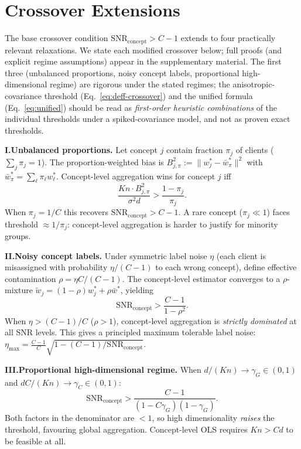 \documentclass[11pt]{article}
\newcommand{\SNR}{\mathrm{SNR}_{\mathrm{concept}}}
\begin{document}
\section{Crossover Extensions}
\label{app:extensions}

The base crossover condition $\SNR > C{-}1$ extends to four practically relevant relaxations.
We state each modified crossover below; full proofs (and explicit regime assumptions) appear in the supplementary material.
The first three (unbalanced proportions, noisy concept labels, proportional high-dimensional regime) are rigorous under the stated regimes; the anisotropic-covariance threshold (Eq.~\ref{eq:deff-crossover}) and the unified formula (Eq.~\ref{eq:unified}) should be read as \emph{first-order heuristic combinations} of the individual thresholds under a spiked-covariance model, and not as proven exact thresholds.

\textbf{I.\;Unbalanced proportions.}
Let concept $j$ contain fraction $\pi_j$ of clients ($\sum_j \pi_j = 1$).
The proportion-weighted bias is $B_{j,\pi}^2 := \|w_j^* - \bar w^*_\pi\|^2$ with $\bar w^*_\pi = \sum_\ell \pi_\ell w_\ell^*$.
Concept-level aggregation wins for concept $j$ iff
\begin{equation}\label{eq:unbal-crossover}
\frac{Kn \cdot B_{j,\pi}^2}{\sigma^2 d} > \frac{1 - \pi_j}{\pi_j}.
\end{equation}
When $\pi_j = 1/C$ this recovers $\SNR > C{-}1$.
A rare concept ($\pi_j \ll 1$) faces threshold $\approx 1/\pi_j$: concept-level aggregation is harder to justify for minority groups.

\textbf{II.\;Noisy concept labels.}
Under symmetric label noise $\eta$ (each client is misassigned with probability $\eta/(C{-}1)$ to each wrong concept), define effective contamination $\rho = \eta C/(C{-}1)$.
The concept-level estimator converges to a $\rho$-mixture $\tilde w_j = (1{-}\rho) w_j^* + \rho \bar w^*$, yielding
\begin{equation}\label{eq:noisy-crossover}
\SNR > \frac{C - 1}{1 - \rho^2}.
\end{equation}
When $\eta > (C{-}1)/C$ ($\rho > 1$), concept-level aggregation is \emph{strictly dominated} at all SNR levels.
This gives a principled maximum tolerable label noise: $\eta_{\max} = \frac{C-1}{C}\sqrt{1 - (C{-}1)/\SNR}$.

\textbf{III.\;Proportional high-dimensional regime.}
When $d/(Kn) \to \gamma_G \in (0,1)$ and $dC/(Kn) \to \gamma_C \in (0,1)$:
\begin{equation}\label{eq:prop-crossover}
\SNR > \frac{C - 1}{(1 - C\gamma_G)(1 - \gamma_G)}.
\end{equation}
Both factors in the denominator are $< 1$, so high dimensionality \emph{raises} the threshold, favouring global aggregation.
Concept-level OLS requires $Kn > Cd$ to be feasible at all.
\end{document}
